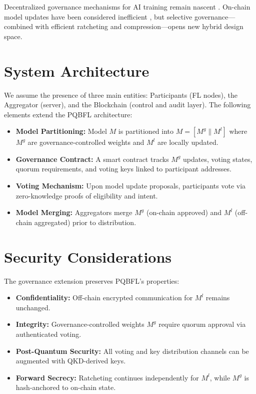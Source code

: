 \documentclass[11pt]{article}
\begin{document}
	Decentralized governance mechanisms for AI training remain nascent \cite{xu2022laf}. On-chain model updates have been considered inefficient \cite{yang2022pqfl}, but selective governance—combined with efficient ratcheting and compression—opens new hybrid design space.
	
	\section{System Architecture}
	We assume the presence of three main entities: Participants (FL nodes), the Aggregator (server), and the Blockchain (control and audit layer). The following elements extend the PQBFL architecture:
	
	\begin{itemize}[nosep]
		\item \textbf{Model Partitioning:} Model $M$ is partitioned into $M = [M^g \| M^l]$ where $M^g$ are governance-controlled weights and $M^l$ are locally updated.
		\item \textbf{Governance Contract:} A smart contract tracks $M^g$ updates, voting states, quorum requirements, and voting keys linked to participant addresses.
		\item \textbf{Voting Mechanism:} Upon model update proposals, participants vote via zero-knowledge proofs of eligibility and intent.
		\item \textbf{Model Merging:} Aggregators merge $M^g$ (on-chain approved) and $M^l$ (off-chain aggregated) prior to distribution.
	\end{itemize}
	
	\section{Security Considerations}
	The governance extension preserves PQBFL’s properties:
	
	\begin{itemize}[nosep]
		\item \textbf{Confidentiality:} Off-chain encrypted communication for $M^l$ remains unchanged.
		\item \textbf{Integrity:} Governance-controlled weights $M^g$ require quorum approval via authenticated voting.
		\item \textbf{Post-Quantum Security:} All voting and key distribution channels can be augmented with QKD-derived keys.
		\item \textbf{Forward Secrecy:} Ratcheting continues independently for $M^l$, while $M^g$ is hash-anchored to on-chain state.
	\end{itemize}
	
\end{document}

